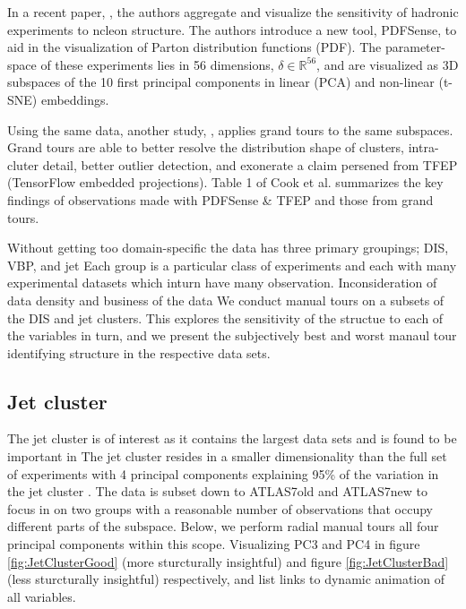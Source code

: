 \documentclass{monashthesis}
\theoremstyle{definition}
\theoremstyle{definition}
\theoremstyle{definition}
\theoremstyle{remark}
\begin{document}
In a recent paper, \textcite{wang_mapping_2018}, the authors aggregate
and visualize the sensitivity of hadronic experiments to ncleon
structure. The authors introduce a new tool, PDFSense, to aid in the
visualization of Parton distribution functions (PDF). The
parameter-space of these experiments lies in 56 dimensions,
\(\delta \in \mathbb{R}^{56}\), and are visualized as 3D subspaces of
the 10 first principal components in linear (PCA) and non-linear (t-SNE)
embeddings.

Using the same data, another study, \textcite{cook_dynamical_2018},
applies grand tours to the same subspaces. Grand tours are able to
better resolve the distribution shape of clusters, intra-cluter detail,
better outlier detection, and exonerate a claim persened from TFEP
(TensorFlow embedded projections). Table 1 of Cook et al. summarizes the
key findings of observations made with PDFSense \& TFEP and those from
grand tours.

Without getting too domain-specific the data has three primary
groupings; DIS, VBP, and jet Each group is a particular class of
experiments and each with many experimental datasets which inturn have
many observation. Inconsideration of data density and business of the
data We conduct manual tours on a subsets of the DIS and jet clusters.
This explores the sensitivity of the structue to each of the variables
in turn, and we present the subjectively best and worst manaul tour
identifying structure in the respective data sets.

\subsection{Jet cluster}\label{jet-cluster}

The jet cluster is of interest as it contains the largest data sets and
is found to be important in \textcite{wang_mapping_2018} The jet cluster
resides in a smaller dimensionality than the full set of experiments
with 4 principal components explaining 95\% of the variation in the jet
cluster \autocite{cook_dynamical_2018}. The data is subset down to
ATLAS7old and ATLAS7new to focus in on two groups with a reasonable
number of observations that occupy different parts of the subspace.
Below, we perform radial manual tours all four principal components
within this scope. Visualizing PC3 and PC4 in figure
\ref{fig:JetClusterGood} (more sturcturally insightful) and figure
\ref{fig:JetClusterBad} (less sturcturally insightful) respectively, and
list links to dynamic animation of all variables.
\end{document}
